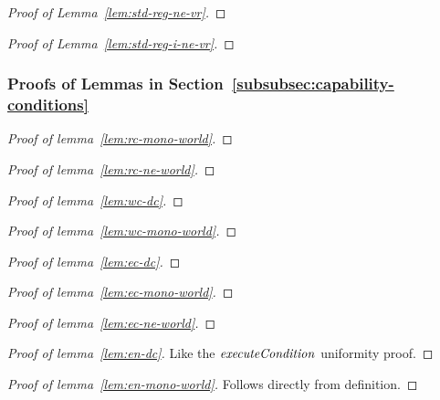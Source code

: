\documentclass{article}
\newcommand{\plainfun}[2]{
  \ifthenelse{\equal{#2}{}}
             {\mathit{#1}}
             {\mathit{#1}(#2)}
}
\newcommand{\execCond}[1]{\plainfun{executeCondition}{#1}}
\begin{document}
\begin{appendices}
\begin{proof}[Proof of Lemma~\ref{lem:std-reg-ne-vr}]
\end{proof}

\begin{proof}[Proof of Lemma~\ref{lem:std-reg-i-ne-vr}]
\end{proof}

\subsubsection{Proofs of Lemmas in Section~\ref{subsubsec:capability-conditions}}

\begin{proof}[Proof of lemma~\ref{lem:rc-mono-world}]
\end{proof}
\begin{proof}[Proof of lemma~\ref{lem:rc-ne-world}]
\end{proof}
\begin{proof}[Proof of lemma~\ref{lem:wc-dc}]
\end{proof}

\begin{proof}[Proof of lemma~\ref{lem:wc-mono-world}]
\end{proof}


\begin{proof}[Proof of lemma~\ref{lem:ec-dc}]
\end{proof}

\begin{proof}[Proof of lemma~\ref{lem:ec-mono-world}]
\end{proof}


\begin{proof}[Proof of lemma~\ref{lem:ec-ne-world}]
\end{proof}



\begin{proof}[Proof of lemma~\ref{lem:en-dc}]
  Like the $\execCond{}$ uniformity proof.
\end{proof}

\begin{proof}[Proof of lemma~\ref{lem:en-mono-world}]
  Follows directly from definition.
\end{proof}


\end{appendices}
\end{document}
